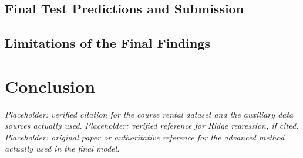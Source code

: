 \documentclass[conference]{IEEEtran}
\newif\ifoutline
\newcommand{\guide}[1]{%
  \ifoutline\par\noindent{\small\color{blue!65!black}%
  \textit{Writing prompt: #1}}\par\fi}
\begin{document}
\subsection{Final Test Predictions and Submission}
\guide{Identify the final refit, submission configuration and 50,000
predictions aligned to the sample-submission IDs. Report an actual competition
score only if available, specifying public/private split and the selected
submission. Do not infer test accuracy from prediction ranges or compare a
competition score directly with a different internal validation population.}

\subsection{Limitations of the Final Findings}
\guide{Discuss limitations supported by the completed analysis: missing
unit-level attributes, small subgroups, duplicate-record uncertainty,
historical snapshot accuracy, correlated features and evaluation-horizon
coverage. Explain how these constrain the claims about the selected model.
Keep this as an assessment of the final evidence, without a future-outlook
or planned-experiments section.}

\section{Conclusion}
\label{sec:conclusion}
\guide{Answer the research questions using the completed final results.
Name the selected model, quantify its performance relative to the baseline,
state which improvements and auxiliary features proved useful, and summarise
the most important error or limitation. End with the practical interpretation
of the findings. Do not end with a list of work the team intends to do.}

\clearpage
\begin{thebibliography}{00}
  \textit{Placeholder: verified citation for the course rental dataset and
  the auxiliary data sources actually used.}
  \textit{Placeholder: verified reference for Ridge regression, if cited.}
  \textit{Placeholder: original paper or authoritative reference for the
  advanced method actually used in the final model.}
\end{thebibliography}
\end{document}
